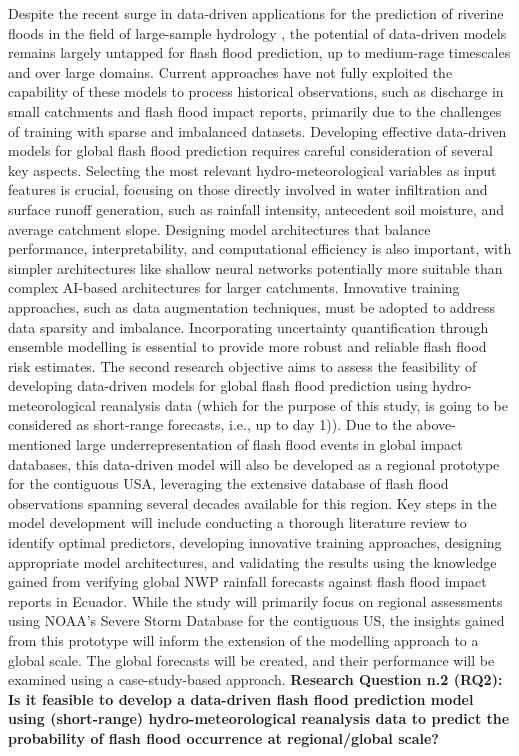 Despite  the recent surge in data-driven applications for the prediction of riverine floods in the field of large-sample hydrology \citep{Nearing2024}, the potential of data-driven models remains largely untapped for flash flood prediction, up to medium-rage timescales and over large domains. Current approaches have not fully exploited the capability of these models to process historical observations, such as discharge in small catchments and flash flood impact reports, primarily due to the challenges of training with sparse and imbalanced datasets. Developing effective data-driven models for global flash flood prediction requires careful consideration of several key aspects. Selecting the most relevant hydro-meteorological variables as input features is crucial, focusing on those directly involved in water infiltration and surface runoff generation, such as rainfall intensity, antecedent soil moisture, and average catchment slope. Designing model architectures that balance performance, interpretability, and computational efficiency is also important, with simpler architectures like shallow neural networks potentially more suitable than complex AI-based architectures for larger catchments. Innovative training approaches, such as data augmentation techniques, must be adopted to address data sparsity and imbalance. Incorporating uncertainty quantification through ensemble modelling is essential to provide more robust and reliable flash flood risk estimates. The second research objective aims to assess the feasibility of developing data-driven models for global flash flood prediction using hydro-meteorological reanalysis data (which for the purpose of this study, is going to be considered as short-range forecasts, i.e., up to day 1)). Due to the above-mentioned large underrepresentation of flash flood events in global impact databases, this data-driven model will also be developed as a regional prototype for the contiguous USA, leveraging the extensive database of flash flood observations spanning several decades available for this region.  Key steps in the model development will include conducting a thorough literature review to identify optimal predictors, developing innovative training approaches, designing appropriate model architectures, and validating the results using the knowledge gained from verifying global NWP rainfall forecasts against flash flood impact reports in Ecuador.
While the study will primarily focus on regional assessments using NOAA's Severe Storm Database for the contiguous US, the insights gained from this prototype will inform the extension of the modelling approach to a global scale. The global forecasts will be created, and their performance will be examined using a case-study-based approach. \textbf{Research Question n.2 (RQ2): Is it feasible to develop a data-driven flash flood prediction model using (short-range) hydro-meteorological reanalysis data to predict the probability of flash flood occurrence at regional/global scale?}

